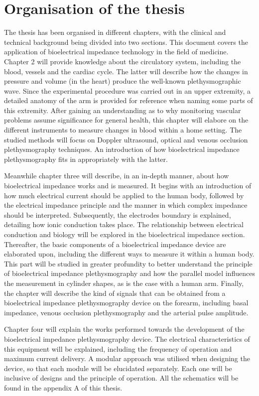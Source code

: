\section{Organisation of the thesis}
The thesis has been organised in different chapters, with the clinical and technical background being divided into two sections. This document covers the application of bioelectrical impedance technology in the field of medicine. Chapter 2 will provide knowledge about the circulatory system, including the blood, vessels and the cardiac cycle. The latter will describe how the changes in pressure and volume (in the heart) produce the well-known plethysmographic wave. Since the experimental procedure was carried out in an upper extremity, a detailed anatomy of the arm is provided for reference when naming some parts of this extremity. After gaining an understanding as to why monitoring vascular problems assume significance for general health, this chapter will elabore on the different instruments to measure changes in blood within a home setting. The studied methods will focus on Doppler ultrasound, optical and venous occlusion plethysmography techniques. An introduction of how bioelectrical impedance plethysmography fits in appropriately with the latter.

Meanwhile chapter three will describe, in an in-depth manner, about how bioelectrical impedance works and is measured. It begins with an introduction of how much electrical current should be applied to the human body, followed by the electrical impedance principle and  the manner in which complex impedance should be interpreted. Subsequently, the electrodes boundary is explained, detailing how ionic conduction takes place. The relationship between electrical conduction and biology will be explored in the bioelectrical impedance section.  Thereafter, the basic components of a bioelectrical impedance device are elaborated upon, including the different ways to measure it within a human body. This part will be studied in greater profundity to better understand the principle of bioelectrical impedance plethysmography and how the parallel model influences the measurement in cylinder shapes, as is the case with a human arm. Finally, the chapter will describe the kind of signals that can be obtained from a bioelectrical impedance plethysmography device on the forearm, including basal impedance, venous occlusion plethysmography and the arterial pulse amplitude.

Chapter four will explain the works performed towards the development of the bioelectrical impedance plethysmography device. The electrical characteristics of this equipment will be explained, including the frequency of operation and maximum current delivery. A modular approach was utilised when designing the device, so that each module will be elucidated separately.  Each one will be inclusive of designs and the principle of operation. All the schematics will be found in the appendix A of this thesis. 

